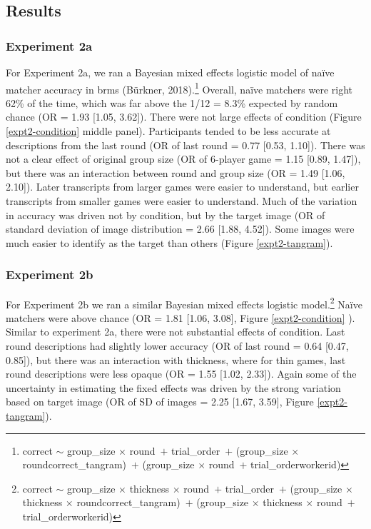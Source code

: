 \documentclass[10pt, letterpaper]{article}
\begin{document}
\subsection{Results}\label{results}

\subsubsection{Experiment 2a}\label{experiment-2a-1}

For Experiment 2a, we ran a Bayesian mixed effects logistic model of
naïve matcher accuracy in brms (Bürkner, 2018).\footnote{correct
  \({\sim}\) group\_size \({\times}\) round~\({+}\) trial\_order~\({+}\)
  (group\_size \({\times}\) round\textbar correct\_tangram)~\({+}\)
  (group\_size \({\times}\) round~\({+}\) trial\_order\textbar workerid)}
Overall, naïve matchers were right 62\% of the time, which was far above
the 1/12 = 8.3\% expected by random chance (OR = 1.93 {[}1.05, 3.62{]}).
There were not large effects of condition (Figure \ref{expt2-condition}
middle panel). Participants tended to be less accurate at descriptions
from the last round (OR of last round = 0.77 {[}0.53, 1.10{]}). There
was not a clear effect of original group size (OR of 6-player game =
1.15 {[}0.89, 1.47{]}), but there was an interaction between round and
group size (OR = 1.49 {[}1.06, 2.10{]}). Later transcripts from larger
games were easier to understand, but earlier transcripts from smaller
games were easier to understand. Much of the variation in accuracy was
driven not by condition, but by the target image (OR of standard
deviation of image distribution = 2.66 {[}1.88, 4.52{]}). Some images
were much easier to identify as the target than others (Figure
\ref{expt2-tangram}).

\subsubsection{Experiment 2b}\label{experiment-2b-1}

For Experiment 2b we ran a similar Bayesian mixed effects logistic
model.\footnote{correct \({\sim}\) group\_size \({\times}\) thickness
  \({\times}\) round~\({+}\) trial\_order~\({+}\) (group\_size
  \({\times}\) thickness \({\times}\)
  round\textbar correct\_tangram)~\({+}\) (group\_size \({\times}\)
  thickness \({\times}\) round~\({+}\) trial\_order\textbar workerid)}
Naïve matchers were above chance (OR = 1.81 {[}1.06, 3.08{]}, Figure
\ref{expt2-condition} ). Similar to experiment 2a, there were not
substantial effects of condition. Last round descriptions had slightly
lower accuracy (OR of last round = 0.64 {[}0.47, 0.85{]}), but there was
an interaction with thickness, where for thin games, last round
descriptions were less opaque (OR = 1.55 {[}1.02, 2.33{]}). Again some
of the uncertainty in estimating the fixed effects was driven by the
strong variation based on target image (OR of SD of images = 2.25
{[}1.67, 3.59{]}, Figure \ref{expt2-tangram}).
\end{document}
